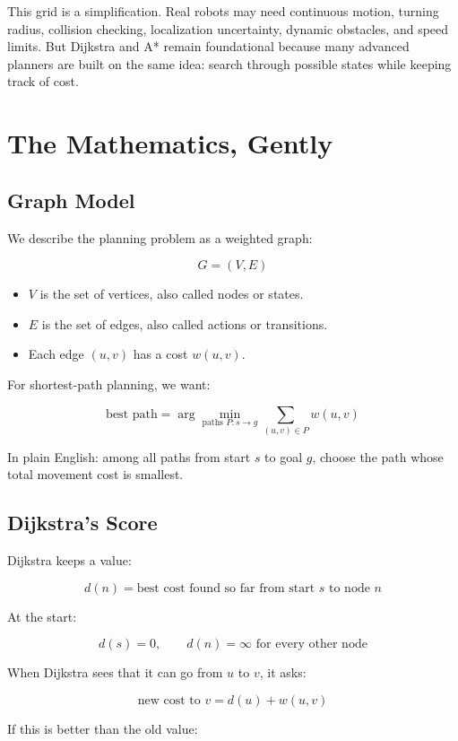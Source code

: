 \documentclass[11pt,a4paper]{article}
\begin{document}
This grid is a simplification. Real robots may need continuous motion, turning radius, collision checking, localization uncertainty, dynamic obstacles, and speed limits. But Dijkstra and A* remain foundational because many advanced planners are built on the same idea: search through possible states while keeping track of cost.

\section{The Mathematics, Gently}

\subsection{Graph Model}

We describe the planning problem as a weighted graph:

\[
G = (V, E)
\]

\begin{itemize}[leftmargin=*]
  \item $V$ is the set of vertices, also called nodes or states.
  \item $E$ is the set of edges, also called actions or transitions.
  \item Each edge $(u,v)$ has a cost $w(u,v)$.
\end{itemize}

For shortest-path planning, we want:

\[
\text{best path} = \arg\min_{\text{paths } P:s\to g} \sum_{(u,v)\in P} w(u,v)
\]

In plain English: among all paths from start $s$ to goal $g$, choose the path whose total movement cost is smallest.

\subsection{Dijkstra's Score}

Dijkstra keeps a value:

\[
d(n) = \text{best cost found so far from start } s \text{ to node } n
\]

At the start:

\[
d(s)=0,\qquad d(n)=\infty \text{ for every other node}
\]

When Dijkstra sees that it can go from $u$ to $v$, it asks:

\[
\text{new cost to } v = d(u) + w(u,v)
\]

If this is better than the old value:
\end{document}

